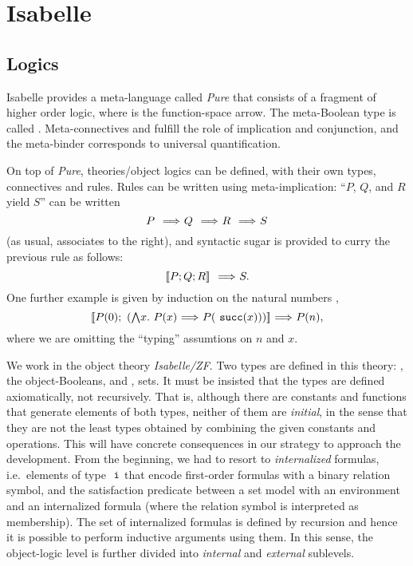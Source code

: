 \section{Isabelle}
\label{sec:isabelle}
\subsection{Logics}
\label{sec:logics}
Isabelle provides a meta-language called \emph{Pure} that consists of
a fragment of higher order logic, where \isatt{\isasymRightarrow} is
the function-space arrow. The meta-Boolean type is called
. Meta-connectives
\isatt{\isasymLongrightarrow} and \isatt{\&\&\&} fulfill the role of
implication and conjunction, and the meta-binder \isatt{\isasymAnd}
corresponds to universal quantification. 

On top of \emph{Pure}, theories/object logics can be defined, with
their own types, connectives and rules. Rules can be written  using
meta-implication: ``$P$, $Q$, and $R$ yield $S$'' can be written
\[
P \ \isatt{\isasymLongrightarrow}\ Q\ \isatt{\isasymLongrightarrow}\ R\ \isatt{\isasymLongrightarrow}\ S
\]
(as usual,  \isatt{\isasymLongrightarrow} associates to the right), and
syntactic sugar is provided to curry the previous rule as follows:
\[
\isasymlbrakk P; Q; R \isasymrbrakk \ \isatt{\isasymLongrightarrow}\ S.
\]
One further example is given by induction on the natural numbers
,
\[
\isasymlbrakk P(0);\ (\textstyle\isasymAnd
x.\ P(x)\ \isasymLongrightarrow\ P(\isatt{succ}(x))) \isasymrbrakk
\ \isasymLongrightarrow\ P(n), 
\]
where we are omitting the ``typing'' assumtions on $n$ and $x$.

We work in the object theory \emph{Isabelle/ZF}. Two types are defined
in this theory: \tyo, the object-Booleans, and \tyi,
sets. It must be insisted that the types are defined axiomatically, not
recursively. That is, although there are constants and functions that
generate elements of both types, neither of them are 
\emph{initial}, in the sense that they are not the least types
obtained by combining the given constants and operations. This will
have concrete consequences in our strategy to approach the
development. From the beginning, we had to resort to
\emph{internalized} formulas, i.e.\ elements of type $\tyi$ that
encode first-order formulas with a binary relation symbol, and the
satisfaction predicate   between a set
model with an environment and an internalized formula (where the
relation symbol is interpreted as membership). The set 
 of internalized
formulas is defined by recursion and hence it is possible to perform
inductive arguments using them. In this sense, the object-logic level
is further divided into \emph{internal} and \emph{external}
sublevels. 

